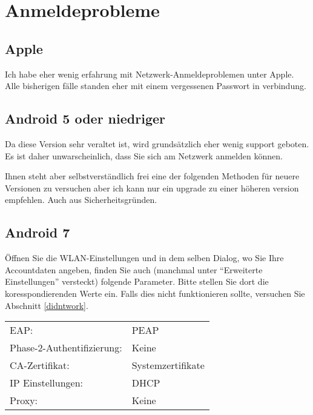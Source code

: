 \documentclass[12pt, a4paper]{article}
\begin{document}
  \section{Anmeldeprobleme}

  \subsection{Apple}
  Ich habe eher wenig erfahrung mit Netzwerk-Anmeldeproblemen unter Apple.
  Alle bisherigen fälle standen eher mit einem vergessenen Passwort in verbindung.

  \subsection{Android 5 oder niedriger}
  Da diese Version sehr veraltet ist, wird grundsätzlich eher wenig support geboten.
  Es ist daher unwarscheinlich, dass Sie sich am Netzwerk anmelden können.

  Ihnen steht aber selbstverständlich frei eine der folgenden Methoden für neuere Versionen zu versuchen aber ich kann nur ein upgrade zu einer höheren version empfehlen.
  Auch aus Sicherheitsgründen.

  \subsection{Android 7}
  Öffnen Sie die WLAN-Einstellungen und in dem selben Dialog, wo Sie Ihre Accountdaten angeben, finden Sie auch (manchmal unter "`Erweiterte Einstellungen"' versteckt) folgende Parameter.
  Bitte stellen Sie dort die koresspondierenden Werte ein.
  Falls dies nicht funktionieren sollte, versuchen Sie Abschnitt \ref{didntwork}.
  \newline
  \newline
  \begin{tabular}{l l}
    EAP:                          & PEAP \\
    Phase-2-Authentifizierung:    & Keine \\
    CA-Zertifikat:                & Systemzertifikate \\
    IP Einstellungen:             & DHCP \\
    Proxy:                        & Keine \\
  \end{tabular}
\end{document}
